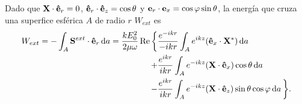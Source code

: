 \begin{enumerate}[label=\textbf{Ejercicio \thechapter.\arabic*},resume]
Dado que $\vb{X}\cdot\vu{e}_r = 0$, $\vu{e}_r\cdot\vu{e}_z = \cos\theta$ y $\vb{e}_r\cdot\vb{e}_x = \cos\varphi\sin\theta$, la energía que cruza una superfice  esférica $A$ de radio $r$ $W_{ext}$ es
%
\begin{align*}
W_{ext} = -\int_{A} \vb{S}^{ext}\cdot\vu{e}_r\dd{a}
 = \frac{kE_0^2}{2\mu\omega}\Re\bigg\{&
\frac{e^{-ikr}}{-ikr}
	\int_A e^{ikz} (\vu{e}_x\cdot\vb{X}^*)\dd{a}\\
+&\frac{e^{ikr}}{ikr}
	\int_A e^{-ikz}(\vb{X}\cdot\vu{e}_x)\cos\theta\dd{a}\\
-&\frac{e^{ikr}}{ikr}
	\int_A e^{-ikz}(\vb{X}\cdot\vu{e}_z)\sin\theta\cos\varphi\dd{a}
	\bigg\}.
\end{align*}
%
\end{enumerate}
